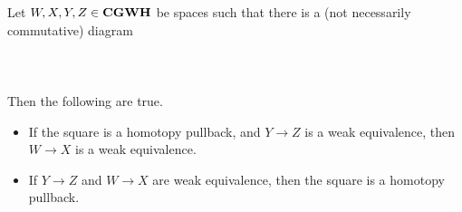 \documentclass[a4paper]{article}
\begin{document}
\begin{prp}{}{} Let $W,X,Y,Z\in\bold{CGWH}$ be spaces such that there is a (not necessarily commutative) diagram \\~\\
\\~\\
Then the following are true. 
\begin{itemize}
\item If the square is a homotopy pullback, and $Y\to Z$ is a weak equivalence, then $W\to X$ is a weak equivalence. 
\item If $Y\to Z$ and $W\to X$ are weak equivalence, then the square is a homotopy pullback. 
\end{itemize}
\end{prp}
\end{document}
